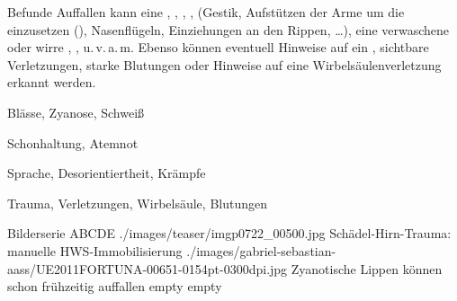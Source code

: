 {}
{}
{}

\Text
{{\eye} Befunde}
{Auffallen kann eine , ,
, ,
 (Gestik, Aufstützen der Arme um die 
einzusetzen (),
Nasenflügeln, Einziehungen an den Rippen, \ldots{}), eine
verwaschene oder wirre , ,
 u.\,v.\,a.\,m. Ebenso
können eventuell Hinweise auf ein , sichtbare
Verletzungen, starke Blutungen oder Hinweise auf eine
Wirbelsäulenverletzung erkannt werden.}
{\begin{compactitem}
    \item Blässe, Zyanose, Schweiß
    \item Schonhaltung, Atemnot
    \item Sprache, Desorientiertheit,
    Krämpfe
  \item Trauma, Verletzungen, Wirbelsäule, Blutungen
  \end{compactitem}}
{}
{}
{}

\begin{PictureSeriesWide}{}{Bilderserie ABCDE}
{./images/teaser/imgp0722_00500.jpg}
{Schädel-Hirn-Trauma: manuelle HWS-Immobilisierung  }
{./images/gabriel-sebastian-aass/UE2011FORTUNA-00651-0154pt-0300dpi.jpg}
{Zyanotische Lippen können schon frühzeitig auffallen }
{empty}
{}
{empty}
{}
\end{PictureSeriesWide}

